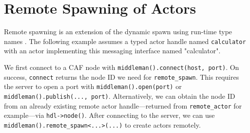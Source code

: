 \section{Remote Spawning of Actors \experimental}
\label{remote-spawn}

Remote spawning is an extension of the dynamic spawn using run-time type names . The following example assumes a typed actor handle named \lstinline^calculator^ with an actor implementing this messaging interface named "calculator".



We first connect to a CAF node with \lstinline^middleman().connect(host, port)^. On success, \lstinline^connect^ returns the node ID we need for \lstinline^remote_spawn^. This requires the server to open a port with \lstinline^middleman().open(port)^ or \lstinline^middleman().publish(..., port)^. Alternatively, we can obtain the node ID from an already existing remote actor handle---returned from \lstinline^remote_actor^ for example---via \lstinline^hdl->node()^. After connecting to the server, we can use \lstinline^middleman().remote_spawn<...>(...)^ to create actors remotely. 